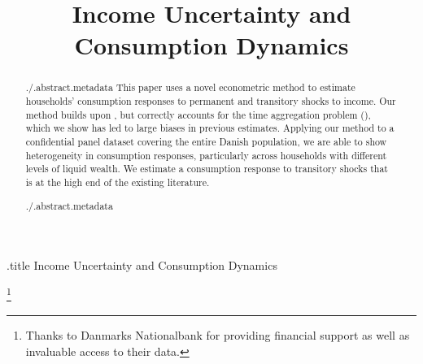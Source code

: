 \documentclass[titlepage]{\econtex}\newcommand{\texname}{IncomeUncertainty}
\begin{document}

	


\begin{verbatimwrite}{\jobname.title}
Income Uncertainty and Consumption Dynamics
\end{verbatimwrite}

\hfill{\tiny \jobname}

\title{Income Uncertainty and \\ Consumption Dynamics}



\maketitle

\begin{abstract}
  \begin{verbatimwrite}{./.abstract.metadata} 
    This paper uses a novel econometric method to estimate households' consumption responses to permanent and transitory shocks to income. Our method builds upon \cite{blundell_consumption_2008}, but correctly accounts for the time aggregation problem (\cite{working_note_1960}), which we show has led to large biases in previous estimates. Applying our method to a confidential panel dataset covering the entire Danish population, we are able to show heterogeneity in consumption responses, particularly across households with different levels of liquid wealth. We estimate a consumption response to transitory shocks that is at the high end of the existing literature.
  \end{verbatimwrite}{./.abstract.metadata} 
  
\end{abstract}


\begin{authorsinfo}
\end{authorsinfo}
\thanks{Thanks to Danmarks Nationalbank for providing financial support as well as invaluable access to their data.}
\end{document}
